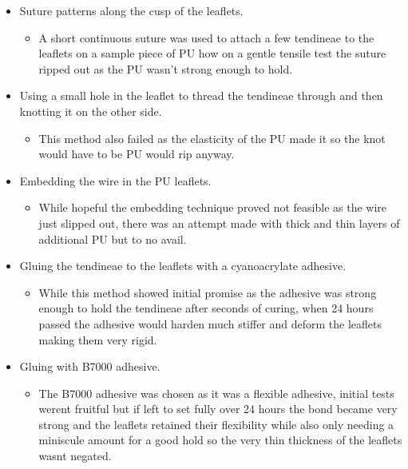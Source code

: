 \begin{itemize}
    \item Suture patterns along the cusp of the leaflets.
          \begin{itemize}
              \item A short continuous suture was used to attach a few tendineae to the leaflets on a sample piece of \gls{PU} how on a gentle tensile test the suture ripped out as the \gls{PU} wasn't strong enough to hold.
          \end{itemize}
    \item Using a small hole in the leaflet to thread the tendineae through and then knotting it on the other side.
          \begin{itemize}
              \item This method also failed as the elasticity of the \gls{PU} made it so the knot would have to be \gls{PU} would rip anyway.
          \end{itemize}
    \item Embedding the wire in the \gls{PU} leaflets.
          \begin{itemize}
              \item While hopeful the embedding technique proved not feasible as the wire just slipped out, there was an attempt made with thick and thin layers of additional \gls{PU} but to no avail.
          \end{itemize}
    \item Gluing the tendineae to the leaflets with a cyanoacrylate adhesive.
          \begin{itemize}
              \item While this method showed initial promise as the adhesive was strong enough to hold the tendineae after seconds of curing, when 24 hours passed the adhesive would harden much stiffer and deform the leaflets making them very rigid.
          \end{itemize}
    \item Gluing with B7000 adhesive.
          \begin{itemize}
              \item The B7000 adhesive was chosen as it was a flexible adhesive, initial tests werent fruitful but if left to set fully over 24 hours the bond became very strong and the leaflets retained their flexibility while also only needing a miniscule amount for a good hold so the very thin thickness of the leaflets wasnt negated.
          \end{itemize}
\end{itemize}

